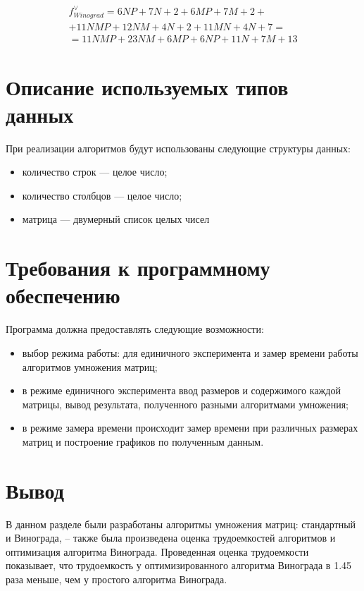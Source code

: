 \begin{multline}\label{winogradworse}
    f_{Winograd}^{\vee} = 6NP + 7N + 2 + 6MP + 7M + 2 + \\
                            + 11NMP + 12NM + 4N + 2 + 11MN + 4N + 7 = \\
                        = 11NMP + 23NM + 6MP + 6NP + 11N + 7M + 13
\end{multline}

\section{Описание используемых типов данных}

При реализации алгоритмов будут использованы следующие структуры данных:

\begin{itemize}
	\item количество строк --- целое число;
	\item количество столбцов --- целое число;
	\item матрица --- двумерный список целых чисел
\end{itemize}

\section{Требования к программному обеспечению}
Программа должна предоставлять следующие возможности:
\begin{itemize}[left=\parindent]
    \item выбор режима работы: для единичного эксперимента и замер времени работы алгоритмов умножения матриц;
    \item в режиме единичного эксперимента ввод размеров и содержимого каждой
        матрицы, вывод результата, полученного разными алгоритмами умножения;
    \item в режиме замера времени происходит замер времени при различных
          размерах матриц и построение графиков по полученным данным.
\end{itemize}

\section{Вывод}

В данном разделе были разработаны алгоритмы умножения матриц: стандартный и Винограда, 
-- также была произведена оценка трудоемкостей алгоритмов и оптимизация алгоритма Винограда. Проведенная оценка трудоемкости показывает,
что трудоемкость у оптимизированного алгоритма Винограда в 1.45 раза меньше, чем у простого
алгоритма Винограда.



